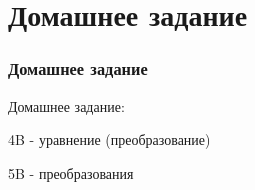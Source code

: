 \documentclass[10pt]{beamer}
\theoremstyle{remark}
\theoremstyle{definition}
\begin{document}
\section{Домашнее задание}
\begin{frame}[allowframebreaks]
\frametitle{Домашнее задание}

Домашнее задание: 

4B - уравнение (преобразование) 

5B - преобразования

\end{frame}
\end{document}
